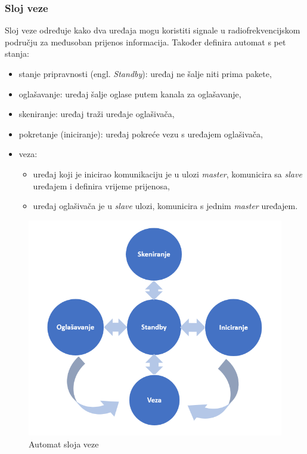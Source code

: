 \subsubsection{Sloj veze}
Sloj veze određuje kako dva uređaja mogu koristiti signale u radiofrekvencijskom području za međusoban prijenos informacija. Također definira automat s pet stanja:
\begin{itemize}
	\item stanje pripravnosti (engl. \textit{Standby}): uređaj ne šalje niti prima pakete,
	\item oglašavanje: uređaj šalje oglase putem kanala za oglašavanje,
	\item skeniranje: uređaj traži uređaje oglašivača,
	\item pokretanje (iniciranje): uređaj pokreće vezu s uređajem oglašivača,
	\item veza: 
	\begin{itemize}
		\item uređaj  koji je inicirao komunikaciju je u ulozi \textit{master}, komunicira sa \textit{slave} uređajem i definira vrijeme prijenosa,
		\item uređaj oglašivača je u \textit{slave} ulozi, komunicira s jednim \textit{master} uređajem.
	\end{itemize}

\end{itemize}

\begin{figure}[ht]
	\centering
	\includegraphics[]{imgs/ll_state_machine}
	\caption{Automat sloja veze}
	\label{fig:ll-state-machine}
\end{figure}

